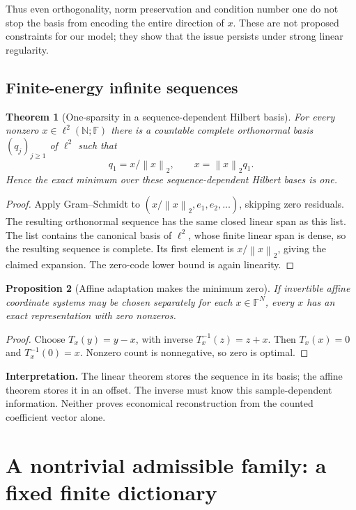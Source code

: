 \documentclass[11pt,a4paper]{article}
\newtheorem{theorem}{Theorem}
\newtheorem{proposition}[theorem]{Proposition}
\theoremstyle{definition}
\theoremstyle{remark}
\newcommand{\F}{\mathbb F}
\newcommand{\N}{\mathbb N}
\newcommand{\norm}[1]{\left\lVert#1\right\rVert}
\begin{document}
Thus even orthogonality, norm preservation and condition number one do not stop
the basis from encoding the entire direction of $x$. These are not proposed
constraints for our model; they show that the issue persists under strong
linear regularity.

\subsection{Finite-energy infinite sequences}

\begin{theorem}[One-sparsity in a sequence-dependent Hilbert basis]\label{thm:hilbert}
For every nonzero $x\in\ell^2(\N;\F)$ there is a countable complete orthonormal
basis $(q_j)_{j\geq1}$ of $\ell^2$ such that
\[
q_1=x/\norm{x}_2,\qquad
x=\norm{x}_2q_1.
\]
Hence the exact minimum over these sequence-dependent Hilbert bases is one.
\end{theorem}
\begin{proof}
Apply Gram--Schmidt to $(x/\norm{x}_2,e_1,e_2,\ldots)$, skipping zero residuals.
The resulting orthonormal sequence has the same closed linear span as this
list. The list contains the canonical basis of $\ell^2$, whose finite linear
span is dense, so the resulting sequence is complete. Its first element is
$x/\norm{x}_2$, giving the claimed expansion. The zero-code lower bound is again
linearity.
\end{proof}

\begin{proposition}[Affine adaptation makes the minimum zero]\label{prop:affine}
If invertible affine coordinate systems may be chosen separately for each
$x\in\F^N$, every $x$ has an exact representation with zero nonzeros.
\end{proposition}
\begin{proof}
Choose $T_x(y)=y-x$, with inverse $T_x^{-1}(z)=z+x$. Then $T_x(x)=0$ and
$T_x^{-1}(0)=x$. Nonzero count is nonnegative, so zero is optimal.
\end{proof}

\textbf{Interpretation.} The linear theorem stores the sequence in its basis;
the affine theorem stores it in an offset. The inverse must know this
sample-dependent information. Neither proves economical reconstruction from
the counted coefficient vector alone.

\section{A nontrivial admissible family: a fixed finite dictionary}
\end{document}
